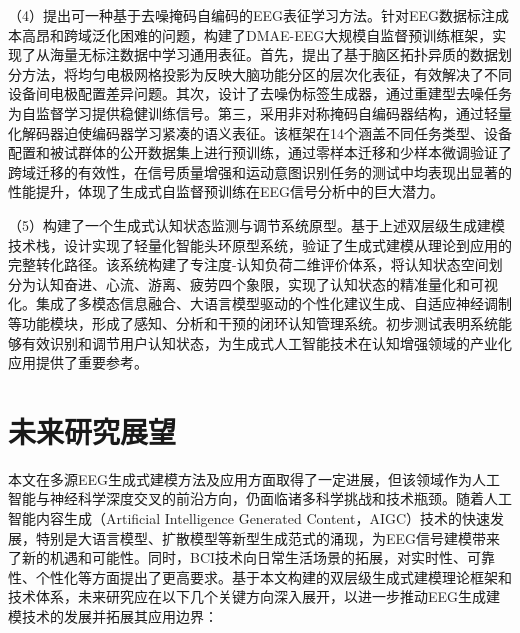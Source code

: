 （4）提出可一种基于去噪掩码自编码的EEG表征学习方法。针对EEG数据标注成本高昂和跨域泛化困难的问题，构建了DMAE-EEG大规模自监督预训练框架，实现了从海量无标注数据中学习通用表征。首先，提出了基于脑区拓扑异质的数据划分方法，将均匀电极网格投影为反映大脑功能分区的层次化表征，有效解决了不同设备间电极配置差异问题。其次，设计了去噪伪标签生成器，通过重建型去噪任务为自监督学习提供稳健训练信号。第三，采用非对称掩码自编码器结构，通过轻量化解码器迫使编码器学习紧凑的语义表征。该框架在14个涵盖不同任务类型、设备配置和被试群体的公开数据集上进行预训练，通过零样本迁移和少样本微调验证了跨域迁移的有效性，在信号质量增强和运动意图识别任务的测试中均表现出显著的性能提升，体现了生成式自监督预训练在EEG信号分析中的巨大潜力。

（5）构建了一个生成式认知状态监测与调节系统原型。基于上述双层级生成建模技术栈，设计实现了轻量化智能头环原型系统，验证了生成式建模从理论到应用的完整转化路径。该系统构建了专注度-认知负荷二维评价体系，将认知状态空间划分为认知奋进、心流、游离、疲劳四个象限，实现了认知状态的精准量化和可视化。集成了多模态信息融合、大语言模型驱动的个性化建议生成、自适应神经调制等功能模块，形成了感知、分析和干预的闭环认知管理系统。初步测试表明系统能够有效识别和调节用户认知状态，为生成式人工智能技术在认知增强领域的产业化应用提供了重要参考。

\section{未来研究展望}

本文在多源EEG生成式建模方法及应用方面取得了一定进展，但该领域作为人工智能与神经科学深度交叉的前沿方向，仍面临诸多科学挑战和技术瓶颈。随着人工智能内容生成（Artificial Intelligence Generated Content，AIGC）技术的快速发展，特别是大语言模型、扩散模型等新型生成范式的涌现，为EEG信号建模带来了新的机遇和可能性。同时，BCI技术向日常生活场景的拓展，对实时性、可靠性、个性化等方面提出了更高要求。基于本文构建的双层级生成式建模理论框架和技术体系，未来研究应在以下几个关键方向深入展开，以进一步推动EEG生成建模技术的发展并拓展其应用边界：

